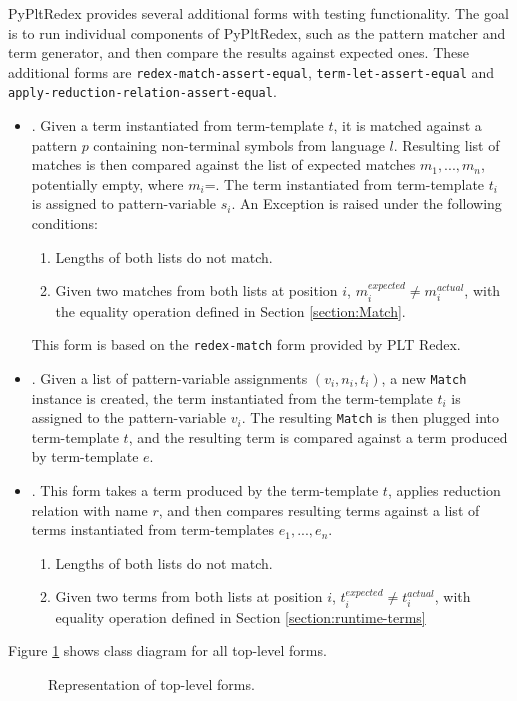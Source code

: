 PyPltRedex provides several additional forms with testing functionality. The goal is to run individual components of PyPltRedex, such as the pattern matcher and term generator, and then compare the results against expected ones. These additional forms are \texttt{redex-match-assert-equal}, \texttt{term-let-assert-equal} and \\ \texttt{apply-reduction-relation-assert-equal}.

\begin{itemize}
\item \RedexMatchAssertEqual. Given a term instantiated from term-template $t$, it is matched against a pattern $p$ containing non-terminal symbols from language $l$. Resulting list of matches is then compared against the list of expected matches $m_1,...,m_n$, potentially empty, where $m_i$=\Match. The term instantiated from term-template $t_i$ is assigned to pattern-variable $s_i$. An Exception is raised under the following conditions:
	\begin{enumerate}
	\item Lengths of both lists do not match.
	\item Given two matches from both lists at position $i$, $m_i^{expected} \neq m_i^{actual}$, with the equality operation defined in Section \ref{section:Match}.
	\end{enumerate}
	This form is based on the \texttt{redex-match} form provided by PLT Redex.

\item \TermLetAssertEqual. Given a list of pattern-variable assignments $(v_i, n_i, t_i)$, a new \texttt{Match} instance is created, the term instantiated from the term-template $t_i$ is assigned to the pattern-variable $v_i$. The resulting \texttt{Match} is then plugged into term-template $t$, and the resulting term is compared against a term produced by term-template $e$.

\item \ApplyReductionRelationAssertEqual. This form takes a term produced by the term-template $t$, applies reduction relation with name $r$, and then compares resulting terms against a list of terms instantiated from term-templates $e_1,...,e_n$.
	\begin{enumerate}
	\item Lengths of both lists do not match.
	\item Given two terms from both lists at position $i$, $t_i^{expected} \neq t_i^{actual}$, with equality operation defined in Section \ref{section:runtime-terms}
	\end{enumerate}
\end{itemize}

Figure \ref{class-diagram-toplevel} shows class diagram for all top-level forms.

\begin{figure}[htb]
	\centering
	\caption{Representation of top-level forms.}
\label{class-diagram-toplevel}
\end{figure}
